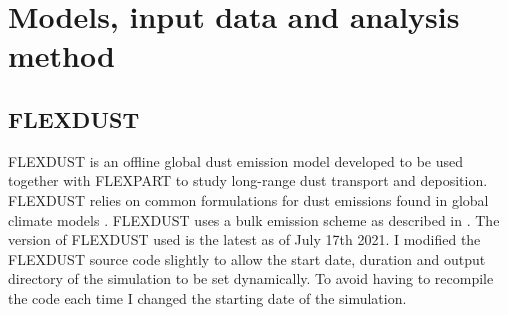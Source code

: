 \chapter{Models, input data and analysis method} 

\section{FLEXDUST}\label{sec:flexdust}
FLEXDUST is an offline global dust emission model developed to be used together 
with FLEXPART to study long-range dust transport and deposition. FLEXDUST relies on common 
formulations for dust emissions found in global climate models \parencite{flexdust_ref_2016}.
FLEXDUST uses a bulk emission scheme as described in .
The version of FLEXDUST used is the latest as of July 17th 2021. 
I modified the FLEXDUST source code slightly to allow the start date, duration and output directory of the simulation to be set dynamically. 
To avoid having to recompile the code each time I changed the starting date of the simulation.  

